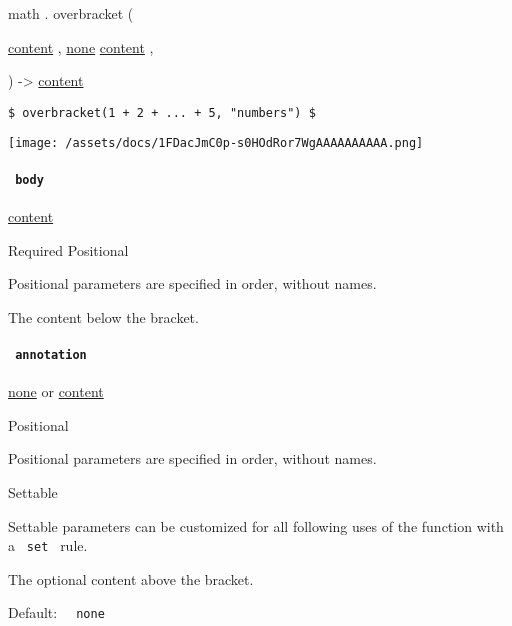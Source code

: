 math { . } { overbracket } (

{ \href{/docs/reference/foundations/content/}{content} , } {
\hyperref[functions-overbracket-parameters-annotation]{}
\href{/docs/reference/foundations/none/}{none}
\href{/docs/reference/foundations/content/}{content} , }

) -\textgreater{} \href{/docs/reference/foundations/content/}{content}

\begin{verbatim}
$ overbracket(1 + 2 + ... + 5, "numbers") $
\end{verbatim}

\texttt{[image: /assets/docs/1FDacJmC0p-s0HOdRor7WgAAAAAAAAAA.png]}

\paragraph{\texorpdfstring{\texttt{\ body\ }}{ body }}\label{functions-overbracket-body}

\href{/docs/reference/foundations/content/}{content}

{Required} {{ Positional }}

\label{functions-overbracket-body-positional-tooltip}
Positional parameters are specified in order, without names.

The content below the bracket.

\paragraph{\texorpdfstring{\texttt{\ annotation\ }}{ annotation }}\label{functions-overbracket-annotation}

\href{/docs/reference/foundations/none/}{none} {or}
\href{/docs/reference/foundations/content/}{content}

{{ Positional }}

\label{functions-overbracket-annotation-positional-tooltip}
Positional parameters are specified in order, without names.

{{ Settable }}

\label{functions-overbracket-annotation-settable-tooltip}
Settable parameters can be customized for all following uses of the
function with a \texttt{\ set\ } rule.

The optional content above the bracket.

Default: \texttt{\ }{\texttt{\ none\ }}\texttt{\ }

